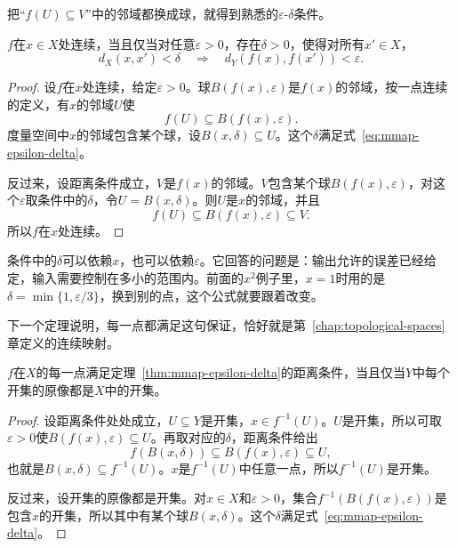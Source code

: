 把“$f(U)\subseteq V$”中的邻域都换成球，就得到熟悉的$\varepsilon$-$\delta$条件。

\begin{theorem}[一点连续的距离判据]
\label{thm:mmap-epsilon-delta}
$f$在$x\in X$处连续，当且仅当对任意$\varepsilon>0$，存在$\delta>0$，使得对所有$x'\in X$，
\begin{equation}
 d_X(x,x')<\delta
 \quad\Longrightarrow\quad
 d_Y(f(x),f(x'))<\varepsilon.
 \label{eq:mmap-epsilon-delta}
\end{equation}
\end{theorem}

\begin{proof}
设$f$在$x$处连续，给定$\varepsilon>0$。球$B(f(x),\varepsilon)$是$f(x)$的邻域，按一点连续的定义，有$x$的邻域$U$使
\[
 f(U)\subseteq B(f(x),\varepsilon).
\]
度量空间中$x$的邻域包含某个球，设$B(x,\delta)\subseteq U$。这个$\delta$满足式~\eqref{eq:mmap-epsilon-delta}。

反过来，设距离条件成立，$V$是$f(x)$的邻域。$V$包含某个球$B(f(x),\varepsilon)$，对这个$\varepsilon$取条件中的$\delta$，令$U=B(x,\delta)$。则$U$是$x$的邻域，并且
\[
 f(U)\subseteq B(f(x),\varepsilon)\subseteq V.
\]
所以$f$在$x$处连续。
\end{proof}

条件中的$\delta$可以依赖$x$，也可以依赖$\varepsilon$。它回答的问题是：输出允许的误差已经给定，输入需要控制在多小的范围内。前面的$x^2$例子里，$x=1$时用的是$\delta=\min\{1,\varepsilon/3\}$，换到别的点，这个公式就要跟着改变。

下一个定理说明，每一点都满足这句保证，恰好就是第~\ref{chap:topological-spaces}章定义的连续映射。

\begin{theorem}[逐点连续与开集原像]
\label{thm:mmap-pointwise-open-preimage}
$f$在$X$的每一点满足定理~\ref{thm:mmap-epsilon-delta}的距离条件，当且仅当$Y$中每个开集的原像都是$X$中的开集。
\end{theorem}

\begin{proof}
设距离条件处处成立，$U\subseteq Y$是开集，$x\in f^{-1}(U)$。$U$是开集，所以可取$\varepsilon>0$使$B(f(x),\varepsilon)\subseteq U$。再取对应的$\delta$，距离条件给出
\[
 f(B(x,\delta))\subseteq B(f(x),\varepsilon)\subseteq U,
\]
也就是$B(x,\delta)\subseteq f^{-1}(U)$。$x$是$f^{-1}(U)$中任意一点，所以$f^{-1}(U)$是开集。

反过来，设开集的原像都是开集。对$x\in X$和$\varepsilon>0$，集合$f^{-1}(B(f(x),\varepsilon))$是包含$x$的开集，所以其中有某个球$B(x,\delta)$。这个$\delta$满足式~\eqref{eq:mmap-epsilon-delta}。
\end{proof}

